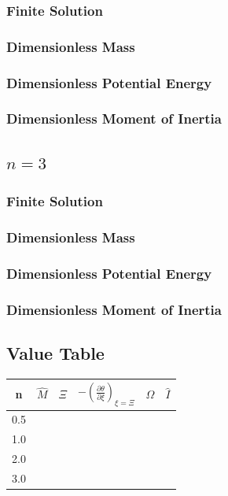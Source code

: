 \documentclass[11pt]{article} %
\newcommand{\pder}[2][]{\frac{\partial#1}{\partial#2}}
\begin{document}
\subsubsection*{Finite Solution}
\subsubsection*{Dimensionless Mass}
\subsubsection*{Dimensionless Potential Energy}
\subsubsection*{Dimensionless Moment of Inertia}

\subsection*{$n = 3$}
\subsubsection*{Finite Solution}
\subsubsection*{Dimensionless Mass}
\subsubsection*{Dimensionless Potential Energy}
\subsubsection*{Dimensionless Moment of Inertia}

\subsection*{Value Table}
\begin{tabular}{| c | c c c c c |}
\hline
n & $\hat{M}$ & $\Xi$ & $-\left(\pder[\theta]{\xi}\right)_{\xi = \Xi}$ & $\hat{\Omega}$ & $\hat{I}$ \\
\hline
0.5 & & & & & \\
1.0 & & & & & \\
2.0 & & & & & \\
3.0 & & & & & \\
\hline
\end{tabular}
\end{document}
